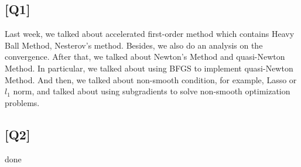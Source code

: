 \documentclass[12pt, a4 paper]{article}
\begin{document}
    \begin{framed}
        \section{[Q1]}
        Last week, we talked about accelerated first-order method which
        contains Heavy Ball Method, Nesterov's method. Besides, we also
        do an analysis on the convergence. After that, we talked about 
        Newton's Method and quasi-Newton Method. In particular, we talked
        about using BFGS to implement quasi-Newton Method. And then, we talked
        about non-smooth condition, for example, Lasso or $l_{1}$ norm, and talked
        about using subgradients to solve non-smooth optimization problems.
    \end{framed}

    \begin{framed}
        \section{[Q2]}
        done
    \end{framed}
\end{document}
